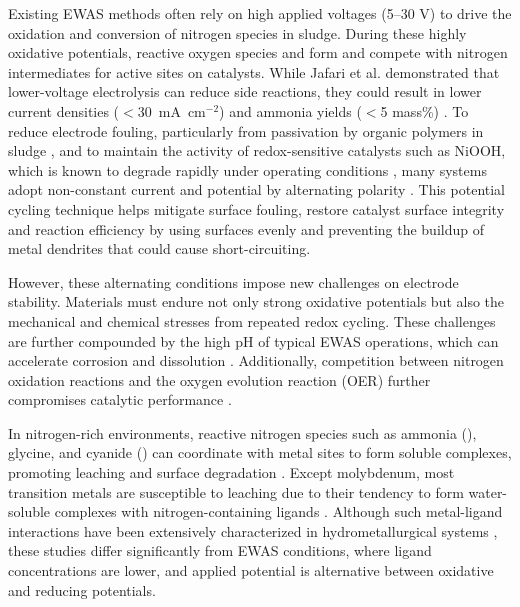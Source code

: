 \documentclass[journal=jacsat,manuscript=article]{achemso}
\begin{document}
Existing EWAS methods often rely on high applied voltages (5–30 V) to drive the oxidation and conversion of nitrogen species in sludge. During these highly oxidative potentials, reactive oxygen species and form and compete with nitrogen intermediates for active sites on catalysts. While Jafari et al. \cite{JafariElectrochemicalProduction} demonstrated that lower-voltage electrolysis can reduce side reactions, they could result in lower current densities ($<$30~mA~cm$^{-2}$) and ammonia yields ($<$5 mass\%) \cite{Zhao2022AAmmonia}. To reduce electrode fouling, particularly from passivation by organic polymers in sludge \cite{Wang2014InCatalysts}, and to maintain the activity of redox-sensitive catalysts such as NiOOH, which is known to degrade rapidly under operating conditions \cite{JafariElectrochemicalProduction}, many systems adopt non-constant current and potential by alternating polarity \cite{Schotten2021AlternatingSynthesis, Hall2020SustainablePrinciples, Chandrasekar2008PulseApplications, Larson2012CurrentReview, Adamson2017ProbingVoltammetry}. This potential cycling technique helps mitigate surface fouling, restore catalyst surface integrity and reaction efficiency by using surfaces evenly and preventing the buildup of metal dendrites that could cause short-circuiting. 

However, these alternating conditions impose new challenges on electrode stability. Materials must endure not only strong oxidative potentials but also the mechanical and chemical stresses from repeated redox cycling. These challenges are further compounded by the high pH of typical EWAS operations, which can accelerate corrosion and dissolution \cite{Sanchis2022NitrateOverview, Popov2015ThermodynamicsCorrosion, Kapaka2010ElectrochemicalElectrode, Mucalo2004InSolutions, Aksu2001ElectrochemistrySolutions, OConnor2018ElectrochemicalSolutions}. Additionally, competition between nitrogen oxidation reactions and the oxygen evolution reaction (OER) further compromises catalytic performance \cite{Li2021Ru-DopedNitrate, Wang2022ElectrochemicalOxidation, Dai2020ElectrochemicalOxides}.

In nitrogen-rich environments, reactive nitrogen species such as ammonia (), glycine, and cyanide () can coordinate with metal sites to form soluble complexes, promoting leaching and surface degradation \cite{Bjerrum1957StabilitySubstances, Meng1996PrinciplesReview, Wang2022AmmoniaSystem}. Except molybdenum, most transition metals are susceptible to leaching due to their tendency to form water-soluble complexes with nitrogen-containing ligands \cite{Meng1996PrinciplesReview, Ma2021ALeaching, Wang2020Reduction-ammoniacalSalts, Li2025Glycine-mediatedStudy}. Although such metal-ligand interactions have been extensively characterized in hydrometallurgical systems \cite{Han1974AMMONIA-AMMONIUMNODULES, Bhuntumkomol1982TheSolutions, Azadi2021SustainableGlycine, Oraby2020GoldPermanganate, Sarvar2023ApplicationStructure, SPARROW1995CyanideApplications, Akcil2015PreciousReview, Wang2022AmmoniaSystem, Ma2021ALeaching, Wang2020Reduction-ammoniacalSalts, Li2025Glycine-mediatedStudy}, these studies differ significantly from EWAS conditions, where ligand concentrations are lower, and applied potential is alternative between oxidative and reducing potentials.
\end{document}
